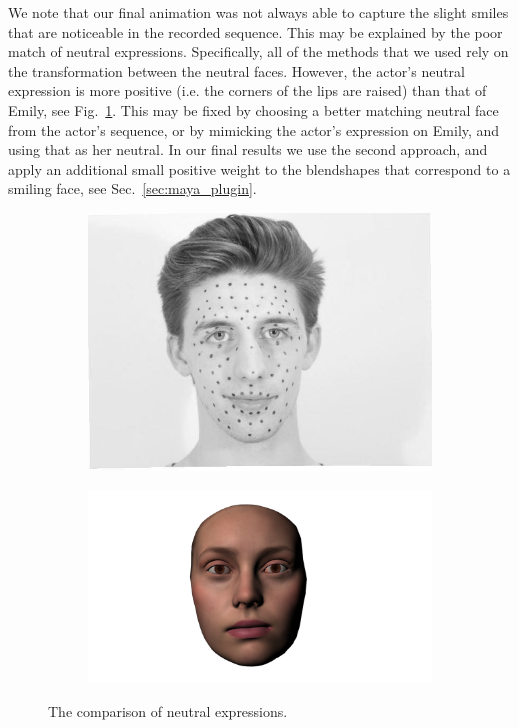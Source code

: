 We note that our final animation was not always able to capture the slight smiles that are noticeable in the recorded sequence. This may be explained by the poor match of neutral expressions. Specifically, all of the methods that we used rely on the transformation between the neutral faces. However, the actor's neutral expression is more positive (i.e. the corners of the lips are raised) than that of Emily, see Fig.~\ref{fig:neutrals}. This may be fixed by choosing a better matching neutral face from the actor's sequence, or by mimicking the actor's expression on Emily, and using that as her neutral. In our final results we use the second approach, and apply an additional small positive weight to the blendshapes that correspond to a smiling face, see Sec.~\ref{sec:maya_plugin}.
\begin{figure}
        \centering
        \begin{subfigure}[b]{0.3\textwidth}
                \includegraphics[width=\textwidth]{img/Richard2neutral}
        \end{subfigure}
        \begin{subfigure}[b]{0.4\textwidth}
                \includegraphics[width=\textwidth]{img/emily_neutral}
        \end{subfigure}
        \caption{The comparison of neutral expressions.}\label{fig:neutrals}
\end{figure}

